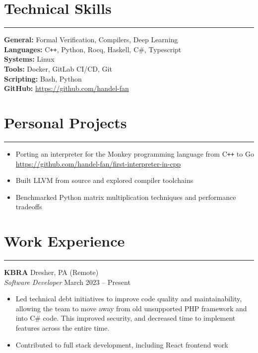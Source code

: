 \documentclass[11pt]{article}
\newcommand{\sectionline}{\noindent\rule{\linewidth}{0.5pt}}
\newcommand{\cplusplus}{C\nolinebreak\hspace{.05em}\texttt{++}}
\newcommand{\csharp}{C\#}
\begin{document}
\section*{Technical Skills}
\sectionline

\textbf{General:} Formal Verification, Compilers, Deep Learning \\
\textbf{Languages:} \cplusplus, Python, Rocq, Haskell, \csharp, Typescript \\
\textbf{Systems:} Linux \\
\textbf{Tools:} Docker, GitLab CI/CD, Git \\
\textbf{Scripting:} Bash, Python \\
\textbf{GitHub:} \url{https://github.com/handel-fan}

\section*{Personal Projects}
\sectionline

\begin{itemize}[leftmargin=*]
    \item Porting an interpreter for the Monkey programming language from \cplusplus{} to Go \\
    \url{https://github.com/handel-fan/first-interpreter-in-cpp}
    \item Built LLVM from source and explored compiler toolchains
    \item Benchmarked Python matrix multiplication techniques and performance tradeoffs
\end{itemize}

\section*{Work Experience}
\sectionline

\textbf{KBRA} \hfill Dresher, PA (Remote) \\
\textit{Software Developer} \hfill March 2023 -- Present
\begin{itemize}[leftmargin=*]
    \item Led technical debt initiatives to improve code quality and maintainability, 
      allowing the team to move away from old unsupported PHP framework and into \csharp{} code.
      This improved security, and decreased time to implement features across the entire time.
    \item Contributed to full stack development, including React frontend work
\end{itemize}
\end{document}
